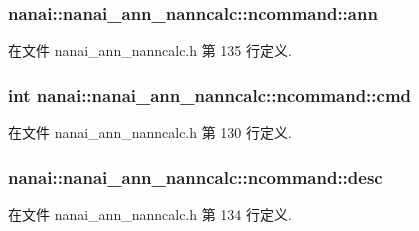\subsubsection[{ann}]{ nanai\+::nanai\+\_\+ann\+\_\+nanncalc\+::ncommand\+::ann}\label{structnanai_1_1nanai__ann__nanncalc_1_1ncommand_a64d0d3494fb258a2d7dc7770b7a1da96}


在文件 nanai\+\_\+ann\+\_\+nanncalc.\+h 第 135 行定义.

\hypertarget{structnanai_1_1nanai__ann__nanncalc_1_1ncommand_a4a61797e6f5a657c50a34a5fb3abda56}{}
\subsubsection[{cmd}]{\setlength{\rightskip}{0pt plus 5cm}int nanai\+::nanai\+\_\+ann\+\_\+nanncalc\+::ncommand\+::cmd}\label{structnanai_1_1nanai__ann__nanncalc_1_1ncommand_a4a61797e6f5a657c50a34a5fb3abda56}


在文件 nanai\+\_\+ann\+\_\+nanncalc.\+h 第 130 行定义.

\hypertarget{structnanai_1_1nanai__ann__nanncalc_1_1ncommand_ad5b646ce90221dc90cc161b8293ba0eb}{}
\subsubsection[{desc}]{ nanai\+::nanai\+\_\+ann\+\_\+nanncalc\+::ncommand\+::desc}\label{structnanai_1_1nanai__ann__nanncalc_1_1ncommand_ad5b646ce90221dc90cc161b8293ba0eb}


在文件 nanai\+\_\+ann\+\_\+nanncalc.\+h 第 134 行定义.

\hypertarget{structnanai_1_1nanai__ann__nanncalc_1_1ncommand_acb609b08ab6f835678886dfeec79da71}{}
